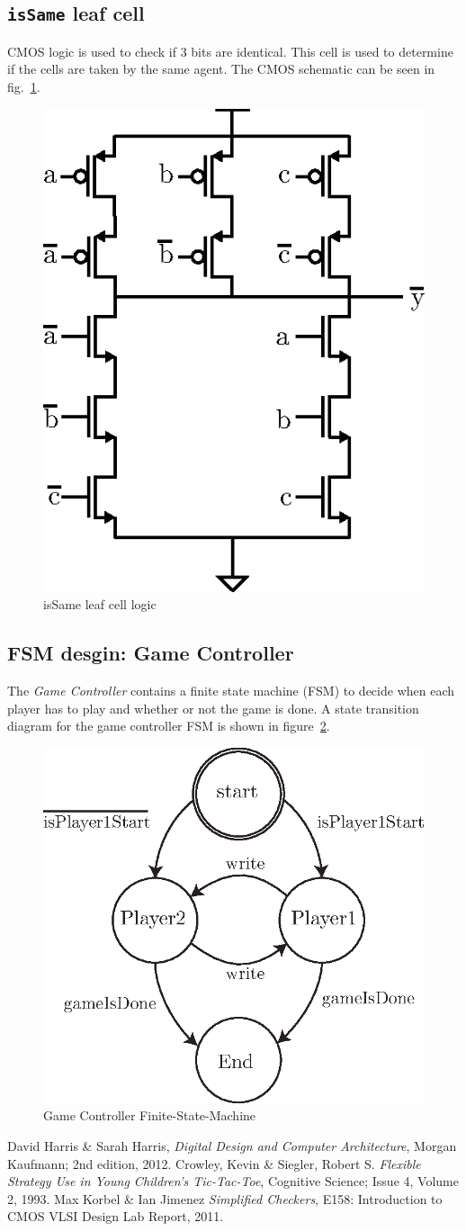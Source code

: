 \documentclass[]{article}
\begin{document}
\subsection{\texttt{isSame} leaf cell}
\label{sec:isSame}
CMOS logic is used to check if 3 bits are identical. This cell is used to determine if the cells are taken by the same agent. The CMOS schematic can be seen in fig.~\ref{fig:isSame-cmos}.

\begin{figure}
\centering
\includegraphics[width=.2\textwidth]{isSame-cmos}
\caption{isSame leaf cell logic}
\label{fig:isSame-cmos}
\end{figure}

\subsection{FSM desgin: Game Controller}
The \emph{Game Controller} contains a finite state machine (FSM) to decide when each player has to play and whether or not the game is done. A state transition diagram for the game controller FSM is shown in figure~\ref{fig:gameController-FSM}.

\begin{figure}
\centering
\includegraphics[width=.3\textwidth]{gameController-FSM}
\caption{Game Controller Finite-State-Machine}
\label{fig:gameController-FSM}
\end{figure}




\begin{thebibliography}{widest entry}
  David Harris \& Sarah Harris,
  \emph{Digital Design and Computer Architecture},
  Morgan Kaufmann; 2nd edition,
  2012.
 Crowley, Kevin \& Siegler, Robert S.
  \emph{Flexible Strategy Use in Young Children's Tic-Tac-Toe},
  Cognitive Science; Issue 4, Volume 2,
  1993.
 Max Korbel \& Ian Jimenez
  \emph{Simplified Checkers},
  E158: Introduction to CMOS VLSI Design Lab Report,
  2011. 

\end{thebibliography}
\end{document}
